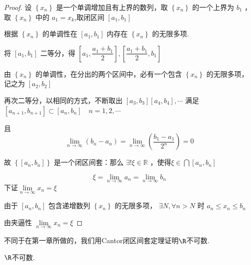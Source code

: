 \begin{proof}
	设 $\left\{x_n\right\}$ 是一个单调增加且有上界的数列，取 $\left\{x_n\right\}$ 的一个上界为 $b_1$ ，取 $\left\{x_n\right\}$ 中的 $a_1=x_k$,取闭区间 $\left[a_1, b_1\right]$ 
	
	根据 $\left\{x_n\right\}$ 的单调性在 $\left[a_1, b_1\right]$ 内存在 $\left\{x_n\right\}$ 的无限多项.
	
	将 $\left[a_1, b_1\right]$ 二等分，得 $\left[a_1, \dfrac{a_1+b_1}{2}\right],\left[\dfrac{a_1+b_1}{2}, b_1\right]$
	
	由 $\left\{x_n\right\}$ 的单调性，在分出的两个区间中，必有一个包含 $\left\{x_n\right\}$ 的无限多项，
	记之为 $\left[a_2, b_2\right]$ 
	
	再次二等分，以相同的方式，不断取出 $\left[a_3, b_3\right] \left[a_4, b_4\right], \cdots$ 满足 $\left[a_{n+1}, b_{n+1}\right] \subset\left[a_n, b_n\right] \quad n=1,2, \cdots$
	
	且 
	$$\lim _{n \rightarrow \infty}\left(b_n-a_n\right)=\lim _{n \rightarrow \infty}\left(\dfrac{b_1-a_1}{2^n}\right)=0$$
	
	故 $\left\{\left[a_n, b_n\right]\right\}$ 是一个闭区间套：那么 $\exists!\xi \in \mathbb{R}$ ，使得$\xi \in \bigcap\left[a_n, b_n\right]$
	
	$$
	\xi=\lim _{n \rightarrow \infty} a_n=\lim _{n \rightarrow \infty} b_n
	$$
	下证$\lim\limits_{n\rightarrow\infty}x_n=\xi$
	
	由于 $\left[a_n, b_n\right]$ 包含递增数列 $\left\{x_n\right\}$ 的无限多项，
	$\exists N, \forall n>N$ 时 $ a_n \leqslant x_n \leqslant b_n$
	
	由夹逼性 $ \lim\limits_{n \rightarrow \infty} x_n=\xi$
\end{proof}
不同于在第一章所做的，我们用Cantor闭区间套定理证明$\R$不可数.
\begin{proposition}
	$\R$不可数.
\end{proposition}

